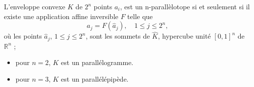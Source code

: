 \documentclass{beamer}
\begin{document}
\begin{frame}
 
L'enveloppe convexe $K$ de $2^n$ points $a_i$, est un n-parallèlotope si et seulement si il existe une application affine inversible $F$ %
 telle que
\begin{equation}
a_j=F(\hat{a}_j),\quad 1\leq j\leq 2^n,
\end{equation}
où les points $\hat{a}_j$,  $1\leq j\leq 2^n$,  sont les sommets de $\widehat{K}$, hypercube unité $[0, 1]^n$ de $\mathbb{R}^n$ ;
\begin{itemize}
\item pour $n=2$, $K$ est un parallélogramme.
\item pour $n=3$, $K$ est un parallélépipède.
\end{itemize}


\end{frame}
\end{document}
